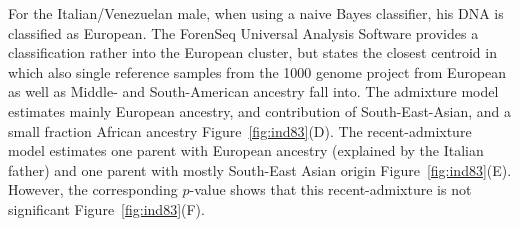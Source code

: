 \documentclass[12pt]{article}
\theoremstyle{definition}
\begin{document}
For the Italian/Venezuelan male, when using a naive Bayes classifier, his DNA is classified as European. The ForenSeq Universal Analysis Software provides a classification rather into the European cluster, but states the closest centroid in which also single reference samples from the 1000 genome project from European as well as Middle- and South-American ancestry fall into. The admixture model estimates mainly European ancestry, and contribution of South-East-Asian, and a small fraction African ancestry Figure~\ref{fig:ind83}(D). The recent-admixture model estimates one parent with European ancestry (explained by the Italian father) and one parent with mostly South-East Asian origin Figure~\ref{fig:ind83}(E). {\color{blue}However, the corresponding $p$-value shows that this recent-admixture is not significant Figure~\ref{fig:ind83}(F). }
\end{document}
